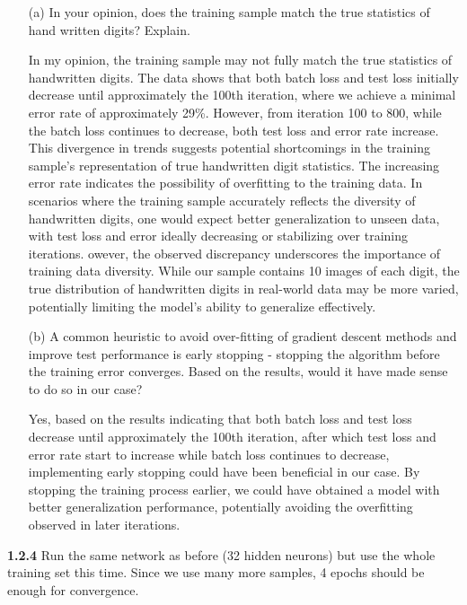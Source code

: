 \documentclass[a4paper, 12pt]{article}
\begin{document}
\begin{itemize}
    \item[(a)] \textcolor{myblue}{In your opinion, does the training sample match the true statistics of hand written digits?
    Explain.}
    \item[] 
        In my opinion, the training sample may not fully match the true statistics of handwritten digits. 
        The data shows that both batch loss and test loss initially decrease until approximately the 100th iteration,
        where we achieve a minimal error rate of approximately 29\%. 
        However, from iteration 100 to 800, while the batch loss continues to decrease, 
        both test loss and error rate increase. 
        This divergence in trends suggests potential shortcomings in the training sample's representation 
        of true handwritten digit statistics. The increasing error rate indicates the possibility of 
        overfitting to the training data. 
        In scenarios where the training sample accurately reflects the diversity of handwritten digits, 
        one would expect better generalization to unseen data, with test loss and error ideally 
        decreasing or stabilizing over training iterations. 
        owever, the observed discrepancy underscores the importance of training data diversity. 
        While our sample contains 10 images of each digit, the true distribution of handwritten 
        digits in real-world data may be more varied, potentially limiting the model's ability to generalize effectively.

    \item[(b)] \textcolor{myblue}{A common heuristic to avoid over-fitting of gradient descent methods and improve test
    performance is early stopping - stopping the algorithm before the training error converges. Based on the results, would it have made sense to do so in our case?}
    \item[] 
    Yes, based on the results indicating that both batch loss and test loss decrease until approximately the 100th 
    iteration, after which test loss and error rate start to increase while batch loss continues to decrease, 
    implementing early stopping could have been beneficial in our case. 
    By stopping the training process earlier, we could have obtained a model with 
    better generalization performance, potentially avoiding the overfitting observed in later iterations.

\end{itemize}

\bigskip
\textcolor{myblue}{
\textbf{1.2.4} Run the same network as before (32 hidden neurons) but use the whole training set this time.
Since we use many more samples, 4 epochs should be enough for convergence.  
}
\end{document}
